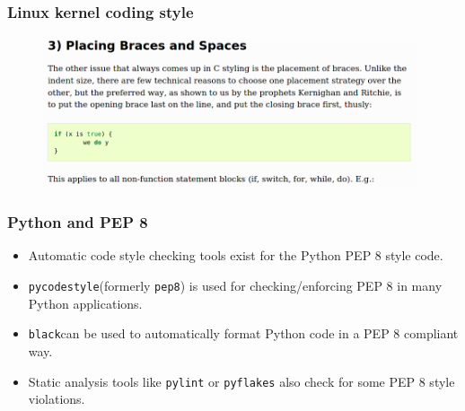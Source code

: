 \documentclass[aspectratio=169]{beamer}
\begin{document}
\begin{frame}
	\frametitle{Linux kernel coding style}

\begin{center}
	
	\begin{figure}[ht!]
	\begin{center}
  	  \includegraphics[width=11cm]{img/kernel-coding-styles-1.png}
	\end{center}
	\end{figure}
\end{center}
\end{frame}

\begin{frame}
	\frametitle{Python and PEP 8}

	\begin{itemize}
		\item Automatic code style checking tools exist for the Python PEP 8 style code.
		\item \texttt{pycodestyle}\footnotemark (formerly \texttt{pep8}) is used for checking/enforcing PEP 8 in many Python applications.
		\item \texttt{black}\footnotemark can be used to automatically format Python code in a PEP 8 compliant way.
		\item Static analysis tools like \texttt{pylint} or \texttt{pyflakes} also check for some PEP 8 style violations.
	\end{itemize}

\end{frame}
\end{document}
